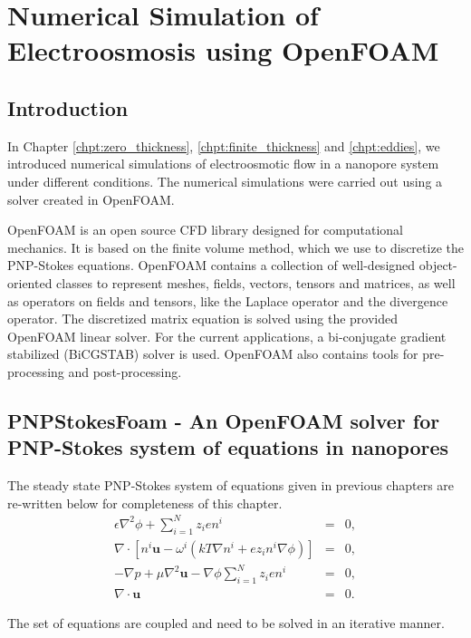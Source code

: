 \chapter{Numerical Simulation of Electroosmosis using OpenFOAM}
\label{chpt:numerical}
\section{Introduction}
In Chapter \ref{chpt:zero_thickness}, \ref{chpt:finite_thickness} and \ref{chpt:eddies}, we introduced numerical simulations of electroosmotic flow in a nanopore system under different conditions. The numerical simulations were carried out using a solver created in OpenFOAM. 

OpenFOAM is an open source CFD library \cite{OPENFOAM} designed for computational mechanics. It is based on the finite volume method, which we use to discretize the PNP-Stokes equations. OpenFOAM contains a collection of well-designed object-oriented classes to represent meshes, fields, vectors, tensors and matrices, as well as operators on fields and tensors, like the Laplace operator and the divergence operator. The discretized matrix equation is solved using the provided OpenFOAM linear solver. For the current applications, a bi-conjugate gradient stabilized (BiCGSTAB) solver is used. OpenFOAM also contains tools for pre-processing and post-processing.

\section{PNPStokesFoam - An OpenFOAM solver for PNP-Stokes system of equations in nanopores}
The steady state PNP-Stokes system of equations given in previous chapters are re-written below for completeness of this chapter. 
\begin{eqnarray}
\epsilon \nabla^2 \phi + \sum_{i=1}^{N} z_ien^i & = & 0,
\label{eq:poisson_num}
\\
\nabla\cdot\left\lbrack n^i\mathbf{u} -\omega^i(kT\nabla
n^i + ez_in^i\nabla\phi) \right\rbrack&=&0 ,
\label{eq:NP_num}
\\ 
-\nabla p + \mu \nabla^2 \mathbf{u} -  \nabla \phi \sum_{i=1}^{N} z_ien^i & = & 0, \label{eq:stokes_num}\\
\nabla \cdot \mathbf{u} & = & 0. \label{eq:continuity_num}
\end{eqnarray} 

The set of equations are coupled and need to be solved in an iterative manner. 

